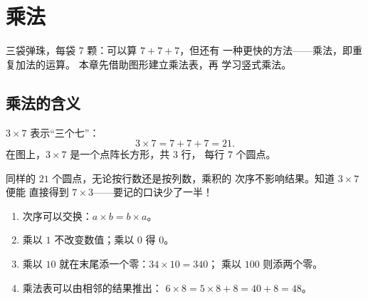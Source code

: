\chapter{乘法}\label{ch:g3:mult}

三袋弹珠，每袋 7 颗：可以算 $7 + 7 + 7$，但还有
一种更快的方法——乘法，即重复加法的运算。
本章先借助图形建立乘法表，再
学习竖式乘法。

\section{乘法的含义}

\begin{definition}[乘法]\label{def:g3:mult:def}
$3 \times 7$ 表示“三个七”：
\[
3 \times 7 = 7 + 7 + 7 = 21 .
\]
在图上，$3 \times 7$ 是一个点阵长方形，共 $3$ 行，
每行 $7$ 个圆点。
\end{definition}

\begin{omfigure}

{\small 同样的 $21$ 个圆点，无论按行数还是按列数，乘积的
次序不影响结果。知道 $3 \times 7$ 便能
直接得到 $7 \times 3$——要记的口诀少了一半！}
\end{omfigure}

\begin{proposition}[有用的规律]\label{prop:g3:mult:rules}
\begin{enumerate}
  \item 次序可以交换：$a \times b = b \times a$。
  \item 乘以 $1$ 不改变数值；乘以 $0$ 得
        $0$。
  \item 乘以 $10$ 就在末尾添一个零：$34 \times 10 = 340$；
        乘以 $100$ 则添两个零。
  \item 乘法表可以由相邻的结果推出：
        $6 \times 8 = 5 \times 8 + 8 = 40 + 8 = 48$。
\end{enumerate}
\end{proposition}
\admitted

